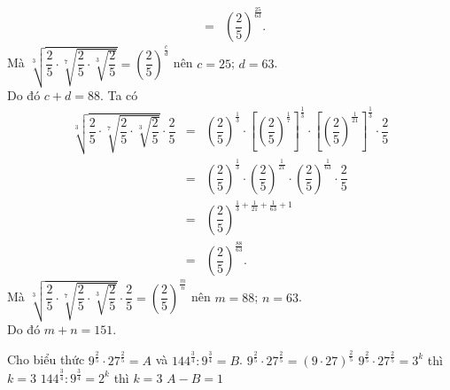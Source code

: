 \begin{ex}
{\begin{itemchoice}
\begin{eqnarray*}
				&=&\left(\dfrac{2}{5} \right)^{\tfrac{25}{63}}. 
			\end{eqnarray*}
			Mà $\sqrt[3]{\dfrac{2}{5} \cdot \sqrt[7]{\dfrac{2}{5} \cdot  \sqrt[3]{\dfrac{2}{5}}}}=\left(\dfrac{2}{5} \right)^{\tfrac{c}{d}}$ nên $c=25$; $d=63$.\\
			Do đó  $c+d=88$.
			 \itemch Ta có \allowdisplaybreaks
			\begin{eqnarray*}
				\sqrt[3]{\dfrac{2}{5} \cdot \sqrt[7]{\dfrac{2}{5} \cdot  \sqrt[3]{\dfrac{2}{5}}}} \cdot \dfrac{2}{5}&=&\left(\dfrac{2}{5} \right)^{\tfrac{1}{3}}\cdot\left[\left(\dfrac{2}{5} \right)^{\tfrac{1}{7}}\right]^{\tfrac{1}{3}}\cdot\left[\left(\dfrac{2}{5} \right)^{\tfrac{1}{21}}\right]^{\tfrac{1}{3}}\cdot\dfrac{2}{5}\\
				 &=&\left(\dfrac{2}{5} \right)^{\tfrac{1}{3}}\cdot\left(\dfrac{2}{5} \right)^{\tfrac{1}{21}}\cdot\left(\dfrac{2}{5} \right)^{\tfrac{1}{63}}\cdot\dfrac{2}{5}\\
				&=&\left(\dfrac{2}{5} \right)^{\tfrac{1}{3}+\tfrac{1}{21}+\tfrac{1}{63}+1}\\ 
				&=&\left(\dfrac{2}{5}  \right)^{\tfrac{88}{63}}.
			\end{eqnarray*}
			Mà $\sqrt[3]{\dfrac{2}{5} \cdot \sqrt[7]{\dfrac{2}{5} \cdot \sqrt[3]{\dfrac{2}{5}}}} \cdot \dfrac{2}{5}=\left(\dfrac{2}{5} \right)^{\tfrac{m}{n}}$ nên $m=88$;  $n=63$.\\
			 Do đó $m+n=151$.
		\end{itemchoice}
	} 
\end{ex}

\begin{ex}%
	Cho biểu thức $9^{\tfrac{2}{5}} \cdot 27^{\tfrac{2}{5}}=A$ và $144^{\tfrac{3}{4}}:9^{\tfrac{3}{4}}=B$. 
	\choiceTF 
		{\True $9^{\tfrac{2}{5}} \cdot 27^{\tfrac{2}{5}}=(9\cdot  27)^{\tfrac{2}{5}}$}
		 {$9^{\tfrac{2}{5}} \cdot 27^{\tfrac{2}{5}}=3^k$ thì $k=3$}
		{\True $144^{\tfrac{3}{4}}:9^{\tfrac{3}{4}}=2^k$  thì $k=3$}
		 {\True $A-B=1$}
\end{ex}

